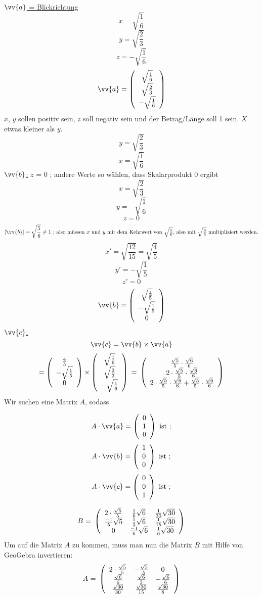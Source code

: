 \underline{$\vv{a}$ = Blickrichtung}
$$x = \sqrt{\frac{1}{6}}$$
$$y = \sqrt{\frac{2}{3}}$$
$$z = -\sqrt{\frac{1}{6}}$$
$$\vv{a}=\vektor{\sqrt{\frac{1}{6}}}{\sqrt{\frac{2}{3}}}{-\sqrt{\frac{1}{6}}} $$
$x$, $y$ sollen positiv sein, $z$ soll negativ sein und der Betrag/Länge soll 1 sein. $X$ etwas kleiner als $y$.
$$y= \sqrt{\frac{2}{3}}$$
$$x= \sqrt{\frac{1}{6}}$$
\underline{$\vv{b}$:}
$z$ = 0 ; andere Werte so wählen, dass Skalarprodukt 0 ergibt
$$x= \sqrt{\frac{2}{3}}$$
$$y=-\sqrt{\frac{1}{6}}$$
$$z=0$$
$$|\vv{b}| = \sqrt{\frac{5}{6}}\neq 1\mbox{ ; also müssen $x$ und $y$ mit dem Kehrwert von $\sqrt{\frac{5}{6}}$, also mit $\sqrt{\frac{6}{5}}$ multipliziert werden.}$$
$$x' = \sqrt{\frac{12}{15}} = \sqrt{\frac{4}{5}}$$
$$y' = - \sqrt{\frac{1}{5}}$$
$$z' = 0$$
$$\vv{b}= \vektor{\sqrt{\frac{4}{5}}}{-\sqrt{\frac{1}{5}}}{0}$$
\underline{$\vv{c}$:}
$$\vv{c} = \vv{b}\times  \vv{a}$$
$$= \left(\begin{array}{c}\frac{4}{5}\\-\sqrt{\frac{1}{5}}\\0\end{array}\right)
      \times \left(\begin{array}{c}\sqrt{\frac{1}{6}}\\\sqrt{\frac{2}{3}}\\-\sqrt{\frac{1}{6}}\end{array}\right) \mbox{ = } 
     \left(\begin{array}{c} 
     \frac{\sqrt{5}}{5}\cdot\frac{\sqrt{6}}{6}\\2\cdot\frac{\sqrt{5}}{5}\cdot\frac{\sqrt{6}}{6}\\2\cdot\frac{\sqrt{5}}{5}\cdot\frac{\sqrt{6}}{6}+\frac{\sqrt{5}}{5}\cdot\frac{\sqrt{6}}{6}\end{array}\right)
$$
Wir suchen eine Matrix $A$, sodass

     $$A\cdot \vv{a}=\vektor{0}{1}{0}\mbox{ ist ;} $$
     $$A\cdot \vv{b}=\vektor{1}{0}{0}\mbox{ ist ;}$$
     $$A\cdot \vv{c}=\vektor{0}{0}{1}\mbox{ ist ;} $$
     
$$\mbox{$B$ = }\left(\begin{array}{ccc} 2\cdot\frac{\sqrt{5}}{5}&\frac{1}{6}\sqrt{6}&\frac{1}{30}\sqrt{30}\\ \frac{-1}{5}\sqrt{5}&\frac{1}{3}\sqrt{6}&\frac{1}{15}\sqrt{30}\\ 0&\frac{-1}{6}\sqrt{6}&\frac{1}{6}\sqrt{30}\\ \end{array}\right)$$
Um auf die Matrix $A$ zu kommen, muss man nun die Matrix $B$ mit Hilfe von GeoGebra invertieren:
$$\mbox{$A$ = } \left(\begin{array}{ccc} 2\cdot\frac{\sqrt{5}}{5}&-\frac{\sqrt{5}}{5}&0\\ \frac{\sqrt{6}}{6}&\frac{\sqrt{6}}{3}&-\frac{\sqrt{6}}{6}\\ \frac{\sqrt{30}}{30}&\frac{\sqrt{30}}{15}&\frac{\sqrt{30}}{6}\\ \end{array}\right)$$
